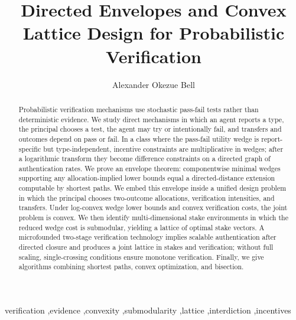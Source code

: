 \documentclass[final,3p,times]{elsarticle}
\theoremstyle{plain}
\theoremstyle{definition}
\newcommand{\1}{\mathbbm{1}}
\begin{document}
\begin{frontmatter}

\title{Directed Envelopes and Convex Lattice Design for Probabilistic Verification}

\author[aff1]{Alexander Okezue Bell}
\address[aff1]{Department of Mathematics, Stanford University, Stanford, CA US}

\begin{abstract}
Probabilistic verification mechanisms use stochastic pass-fail tests rather than deterministic evidence. We study direct mechanisms in which an agent reports a type, the principal chooses a test, the agent may try or intentionally fail, and transfers and outcomes depend on pass or fail. In a class where the pass-fail utility wedge is report-specific but type-independent, incentive constraints are multiplicative in wedges; after a logarithmic transform they become difference constraints on a directed graph of authentication rates. We prove an envelope theorem: componentwise minimal wedges supporting any allocation-implied lower bounds equal a directed-distance extension computable by shortest paths. We embed this envelope inside a unified design problem in which the principal chooses two-outcome allocations, verification intensities, and transfers. Under log-convex wedge lower bounds and convex verification costs, the joint problem is convex. We then identify multi-dimensional stake environments in which the reduced wedge cost is submodular, yielding a lattice of optimal stake vectors. A microfounded two-stage verification technology implies scalable authentication after directed closure and produces a joint lattice in stakes and verification; without full scaling, single-crossing conditions ensure monotone verification. Finally, we give algorithms combining shortest paths, convex optimization, and bisection.
\end{abstract}

\begin{keyword}
verification \sep evidence \sep convexity \sep submodularity \sep lattice \sep interdiction \sep incentives
\end{keyword}


\end{frontmatter}
\end{document}
